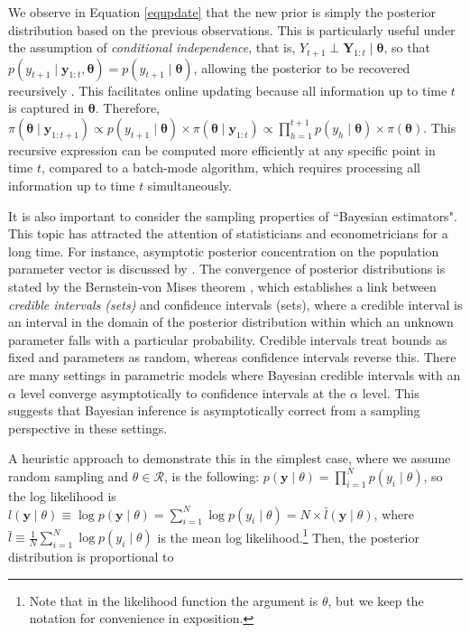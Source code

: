 We observe in Equation \ref{equpdate} that the new prior is simply the posterior distribution based on the previous observations. This is particularly useful under the assumption of \textit{conditional independence}, that is, $Y_{t+1} \perp \mathbf{Y}_{1:t} \mid \bm{\theta}$, so that $p(y_{t+1} \mid \mathbf{y}_{1:t}, \bm{\theta}) = p(y_{t+1} \mid \bm{\theta})$, allowing the posterior to be recovered recursively \cite{petris2009dynamic}. This facilitates online updating because all information up to time $t$ is captured in $\bm{\theta}$. Therefore, $\pi(\bm{\theta} \mid \mathbf{y}_{1:t+1}) \propto p(y_{t+1} \mid \bm{\theta}) \times \pi(\bm{\theta} \mid \mathbf{y}_{1:t}) \propto \prod_{h=1}^{t+1} p(y_h \mid \bm{\theta}) \times \pi(\bm{\theta})$. This recursive expression can be computed more efficiently at any specific point in time $t$, compared to a batch-mode algorithm, which requires processing all information up to time $t$ simultaneously.

It is also important to consider the sampling properties of ``Bayesian estimators". This topic has attracted the attention of statisticians and econometricians for a long time. For instance, asymptotic posterior concentration on the population parameter vector is discussed by \cite{bickel1969some}. The convergence of posterior distributions is stated by the Bernstein-von Mises theorem \cite{Lehmann2003,van2000asymptotic}, which establishes a link between \textit{credible intervals (sets)} and confidence intervals (sets), where a credible interval is an interval in the domain of the posterior distribution within which an unknown parameter falls with a particular probability. Credible intervals treat bounds as fixed and parameters as random, whereas confidence intervals reverse this. There are many settings in parametric models where Bayesian credible intervals with an $\alpha$ level converge asymptotically to confidence intervals at the $\alpha$ level. This suggests that Bayesian inference is asymptotically correct from a sampling perspective in these settings.

A heuristic approach to demonstrate this in the simplest case, where we assume random sampling and $\theta \in \mathcal{R}$, is the following: $p(\mathbf{y} \mid \theta) = \prod_{i=1}^N p(y_i \mid \theta)$, so the log likelihood is $l(\mathbf{y} \mid \theta) \equiv \log p(\mathbf{y} \mid \theta) = \sum_{i=1}^N \log p(y_i \mid \theta) = N \times \bar{l}(\mathbf{y} \mid \theta)$, where $\bar{l} \equiv \frac{1}{N} \sum_{i=1}^N \log p(y_i \mid \theta)$ is the mean log likelihood.\footnote{Note that in the likelihood function the argument is $\theta$, but we keep the notation for convenience in exposition.} Then, the posterior distribution is proportional to

